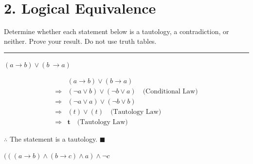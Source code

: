 \documentclass[]{article}
\begin{document}
\section*{2. Logical Equivalence}
Determine whether each statement below is a tautology, a contradiction, or neither. Prove your result. Do not
use truth tables.
\vspace{0.1in}
\hrule
\vspace{0.1in}
\begin{question}
    $(a \rightarrow b) \lor (b\ \rightarrow a)$
\end{question}
\begin{align*}
    & (a \rightarrow b) \lor (b \rightarrow a) \\
    \Rightarrow & (\neg a \lor b) \lor (\neg b \lor a) \quad \text{(Conditional Law)} \\
    \Rightarrow & (\neg a \lor a) \lor (\neg b \lor b) \quad \\
    \Rightarrow&  (t)  \lor (t) \quad \text{(Tautology Law)} \\
    \Rightarrow & \mathbf{t} \quad \text{(Tautology Law)}
\end{align*}
\begin{center}
    $\therefore$ The statement is a tautology. $\blacksquare$
\end{center}

\begin{question}
    $(((a \rightarrow b) \land (b \rightarrow c) \land a) \land \neg c$
\end{question}
\end{document}
